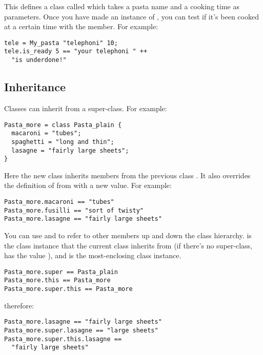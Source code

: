 \noindent
This defines a class called  which takes a pasta name
and a cooking time as parameters. Once you have made an instance of
, you can test if it's been cooked at a certain time with the
 member. For example:

\begin{verbatim}
tele = My_pasta "telephoni" 10;
tele.is_ready 5 == "your telephoni " ++
  "is underdone!"
\end{verbatim}

\subsection{Inheritance}

Classes can inherit from a super-class. For example:

\begin{verbatim}
Pasta_more = class Pasta_plain { 
  macaroni = "tubes";
  spaghetti = "long and thin";
  lasagne = "fairly large sheets";
}
\end{verbatim}

\noindent
Here the new class  inherits members from the previous class
. It also overrides the definition of  from
 with a new value. For example:

\begin{verbatim}
Pasta_more.macaroni == "tubes"
Pasta_more.fusilli == "sort of twisty"
Pasta_more.lasagne == "fairly large sheets"
\end{verbatim}

You can use  and
 to refer to other members up and down the class hierarchy.
 is the class instance that the current class inherits from (if
there's no super-class,  has the value \ct{[]}), and
 is the most-enclosing class instance. 

\begin{verbatim}
Pasta_more.super == Pasta_plain
Pasta_more.this == Pasta_more
Pasta_more.super.this == Pasta_more 
\end{verbatim}

\noindent
therefore:

\begin{verbatim}
Pasta_more.lasagne == "fairly large sheets"
Pasta_more.super.lasagne == "large sheets"
Pasta_more.super.this.lasagne ==
  "fairly large sheets" 
\end{verbatim}

